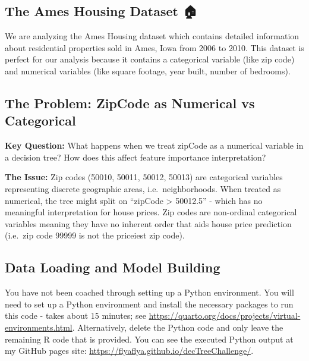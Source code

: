 \documentclass[
  letterpaper,
  DIV=11,
  numbers=noendperiod]{scrartcl}
\begin{document}
\subsection{The Ames Housing Dataset 🏠}\label{the-ames-housing-dataset}

We are analyzing the Ames Housing dataset which contains detailed
information about residential properties sold in Ames, Iowa from 2006 to
2010. This dataset is perfect for our analysis because it contains a
categorical variable (like zip code) and numerical variables (like
square footage, year built, number of bedrooms).

\subsection{The Problem: ZipCode as Numerical vs
Categorical}\label{the-problem-zipcode-as-numerical-vs-categorical}

\textbf{Key Question:} What happens when we treat zipCode as a numerical
variable in a decision tree? How does this affect feature importance
interpretation?

\textbf{The Issue:} Zip codes (50010, 50011, 50012, 50013) are
categorical variables representing discrete geographic areas,
i.e.~neighborhoods. When treated as numerical, the tree might split on
``zipCode \textgreater{} 50012.5'' - which has no meaningful
interpretation for house prices. Zip codes are non-ordinal categorical
variables meaning they have no inherent order that aids house price
prediction (i.e.~zip code 99999 is not the priceiest zip code).

\subsection{Data Loading and Model
Building}\label{data-loading-and-model-building}

\begin{tcolorbox}[enhanced jigsaw, coltitle=black, colframe=quarto-callout-important-color-frame, bottomtitle=1mm, colbacktitle=quarto-callout-important-color!10!white, breakable, title=\textcolor{quarto-callout-important-color}{\faExclamation}\hspace{0.5em}{🎯 Note on Python Usage}, rightrule=.15mm, colback=white, titlerule=0mm, arc=.35mm, left=2mm, opacitybacktitle=0.6, leftrule=.75mm, toptitle=1mm, bottomrule=.15mm, toprule=.15mm, opacityback=0]

You have not been coached through setting up a Python environment. You
will need to set up a Python environment and install the necessary
packages to run this code - takes about 15 minutes; see
\url{https://quarto.org/docs/projects/virtual-environments.html}.
Alternatively, delete the Python code and only leave the remaining R
code that is provided. You can see the executed Python output at my
GitHub pages site: \url{https://flyaflya.github.io/decTreeChallenge/}.

\end{tcolorbox}
\end{document}
